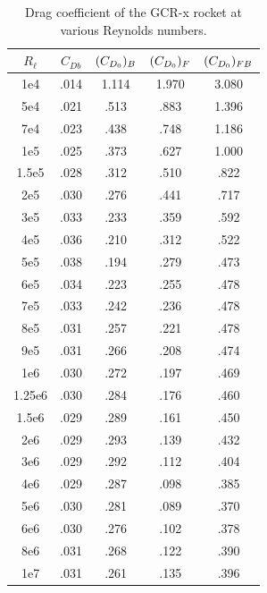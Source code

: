\begin{table}[htbp]
  \centering
  \caption{Drag coefficient of the GCR-x rocket at various Reynolds numbers.}
  \label{ch3:tab:6}
  \begin{tabular}{@{}S[table-alignment-mode=none,table-number-alignment=left]
      *{4}{S[table-format=1.3,print-zero-integer=false]}@{}}
    \toprule
    {$R_\ell$} & {$C_{Db}$} & {$(C_{D_0})_B$} & {$(C_{D_0})_F$} & {$(C_{D_0})_{FB}$} \\
    \midrule
    1e4    & .014 & 1.114 & 1.970 & 3.080 \\
    5e4    & .021 & .513  & .883  & 1.396 \\
    7e4    & .023 & .438  & .748  & 1.186 \\
    1e5    & .025 & .373  & .627  & 1.000 \\
    1.5e5  & .028 & .312  & .510  & .822  \\
    2e5    & .030 & .276  & .441  & .717  \\
    3e5    & .033 & .233  & .359  & .592  \\
    4e5    & .036 & .210  & .312  & .522  \\
    5e5    & .038 & .194  & .279  & .473  \\
    6e5    & .034 & .223  & .255  & .478  \\
    7e5    & .033 & .242  & .236  & .478  \\
    8e5    & .031 & .257  & .221  & .478  \\
    9e5    & .031 & .266  & .208  & .474  \\
    1e6    & .030 & .272  & .197  & .469  \\
    1.25e6 & .030 & .284  & .176  & .460  \\
    1.5e6  & .029 & .289  & .161  & .450  \\
    2e6    & .029 & .293  & .139  & .432  \\
    3e6    & .029 & .292  & .112  & .404  \\
    4e6    & .029 & .287  & .098  & .385  \\
    5e6    & .030 & .281  & .089  & .370  \\
    6e6    & .030 & .276  & .102  & .378  \\
    8e6    & .031 & .268  & .122  & .390  \\
    1e7    & .031 & .261  & .135  & .396  \\
    \bottomrule
  \end{tabular}
\end{table}

